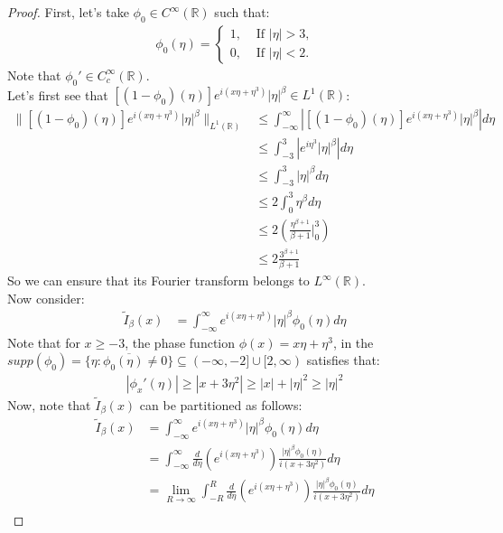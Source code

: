 \begin{proof}{} 
  First, let’s take $\phi_{0}\in C^{\infty}(\mathbb{R})$ such that:
  \begin{align*}
    \phi_0(\eta)= 
    \begin{cases}
      1, &\text{ If } |\eta|>3 \text{,}\\
      0, &\text{ If } |\eta|<2 .
    \end{cases}
  \end{align*}
  Note that $\phi_0'\in C^{\infty}_{c}(\mathbb{R})$.\\
  Let’s first see that $[(1-\phi_0)(\eta)]e^{i(x\eta+\eta^3)}|\eta|^{\beta}\in L^1(\mathbb{R})$:
  \begin{align*}
    \|[(1-\phi_0)(\eta)]e^{i(x\eta+\eta^3)}|\eta|^{\beta}\|_{L^{1}(\mathbb{R})}&\leq\int_{-\infty}^{\infty}\left| [(1-\phi_0)(\eta)]e^{i(x\eta+\eta^3)}|\eta|^{\beta} \right|d\eta\\
    &\leq \int_{-3}^{3}\left| e^{i\eta^3}|\eta|^{\beta} \right|d\eta \\
    &\leq \int_{-3}^{3}|\eta|^{\beta}d\eta\\
    &\leq 2\int_{0}^{3}\eta^{\beta}d\eta\\
    &\leq 2\left(\frac{\eta^{\beta+1}}{\beta+1}\Big|_{0}^{3}\right)\\
    &\leq 2\frac{3^{\beta+1}}{\beta+1}
  \end{align*}
  So we can ensure that its Fourier transform belongs to $L^{\infty}(\mathbb{R})$.\\
  Now consider:
  \begin{align*}
    \tilde{I}_{\beta}(x)&=\int_{-\infty}^{\infty}e^{i(x\eta+\eta^3)}|\eta|^{\beta}\phi_0(\eta)d\eta
  \end{align*}
  Note that for $x\geq -3$, the phase function $\phi(x)=x\eta+\eta^3$, in the $supp(\phi_0)=\overline{\{\eta: \phi_0(\eta)\neq 0\}}\subseteq (-\infty,-2]\cup[2,\infty)$ satisfies that:
  \begin{align*}
    |\phi_x'(\eta)|\geq |x+3\eta^2|\geq |x|+|\eta|^2\geq |\eta|^2
  \end{align*}
  Now, note that $\tilde{I}_{\beta}(x)$ can be partitioned as follows:
  \begin{align*}
    \tilde{I}_{\beta}(x)&=\int_{-\infty}^{\infty}e^{i(x\eta+\eta^3)}|\eta|^{\beta}\phi_0(\eta)d\eta\\
    &=\int_{-\infty}^{\infty}\frac{d}{d\eta}\left( e^{i(x\eta+\eta^3)} \right)\frac{|\eta|^{\beta}\phi_0(\eta)}{i(x+3\eta^2)}d\eta\\
    &=\lim_{R\rightarrow \infty}\int_{-R}^{R}\frac{d}{d\eta}\left( e^{i(x\eta+\eta^3)} \right)\frac{|\eta|^{\beta}\phi_0(\eta)}{i(x+3\eta^2)}d\eta\\

\end{align*}
\end{proof}
